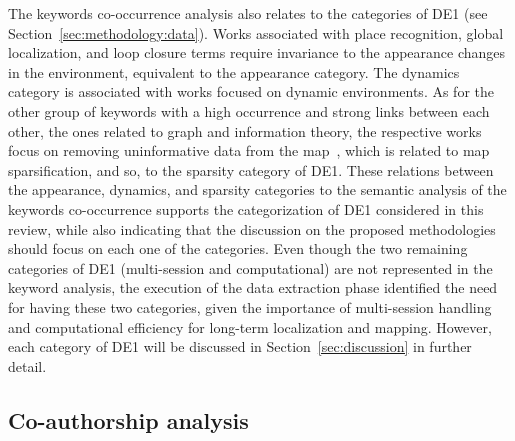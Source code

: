 The keywords co-occurrence analysis also relates to the categories of DE1 (see Section~\ref{sec:methodology:data}). Works associated with place recognition, global localization, and loop closure terms require invariance to the appearance changes in the environment, equivalent to the appearance category. The dynamics category is associated with works focused on dynamic environments. As for the other group of keywords with a high occurrence and strong links between each other, the ones related to graph and information theory, the respective works focus on removing uninformative data from the map~\parencite{kretzschmar-stachniss:2012:0278364912455072}, which is related to map sparsification, and so, to the sparsity category of DE1. These relations between the appearance, dynamics, and sparsity categories to the semantic analysis of the keywords co-occurrence supports the categorization of DE1 considered in this review, while also indicating that the discussion on the proposed methodologies should focus on each one of the categories. Even though the two remaining categories of DE1 (multi-session and computational) are not represented in the keyword analysis, the execution of the data extraction phase identified the need for having these two categories, given the importance of multi-session handling and computational efficiency for long-term localization and mapping. However, each category of DE1 will be discussed in Section~\ref{sec:discussion} in further detail.


\subsection{Co-authorship analysis}
\label{sec:overview:authors}

